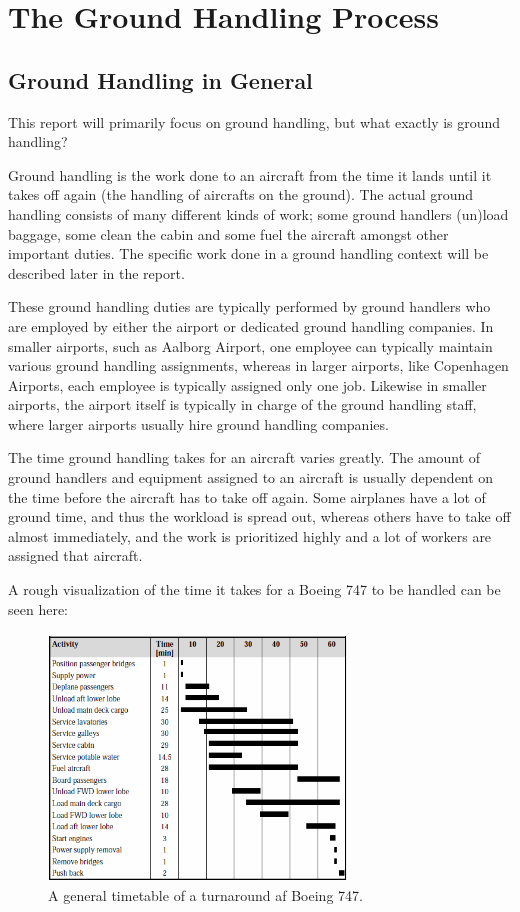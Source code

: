 \chapter{The Ground Handling Process}
\section{Ground Handling in General}
This report will primarily focus on ground handling, but what exactly is ground handling?

Ground handling is the work done to an aircraft from the time it lands until it takes off again (the handling of aircrafts on the ground). The actual ground handling consists of many different kinds of work; some ground handlers (un)load baggage, some clean the cabin and some fuel the aircraft amongst other important duties. The specific work done in a ground handling context will be described later in the report.

These ground handling duties are typically performed by ground handlers who are employed by either the airport or dedicated ground handling companies. In smaller airports, such as Aalborg Airport, one employee can typically maintain various ground handling assignments, whereas in larger airports, like Copenhagen Airports, each employee is typically assigned only one job. Likewise in smaller airports, the airport itself is typically in charge of the ground handling staff, where larger airports usually hire ground handling companies.

The time ground handling takes for an aircraft varies greatly. The amount of ground handlers and equipment assigned to an aircraft is usually dependent on the time before the aircraft has to take off again. Some airplanes have a lot of ground time, and thus the workload is spread out, whereas others have to take off almost immediately, and the work is prioritized highly and a lot of workers are assigned that aircraft.


A rough visualization of the time it takes for a Boeing 747 to be handled can be seen here:
\begin{figure}[H]
\centering
\includegraphics[width=300px]{Grafik/timetable}
\caption{A general timetable of a turnaround af Boeing 747.}
\label{timetable}
\end{figure}